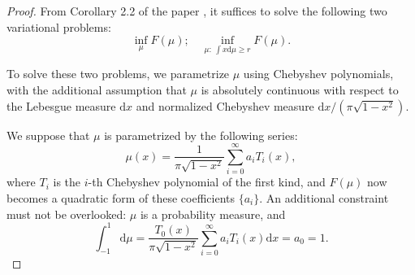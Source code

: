 \documentclass{article} %
\begin{document}
\begin{proof}
    From Corollary 2.2 of the paper \citep{Eichelsbacher_2011}, it suffices to solve the following two variational problems:
    \[ \inf_\mu F(\mu); \quad \inf_{\mu:\  \int x\mathrm{d} \mu \ge r} F(\mu). \]

    To solve these two problems, we parametrize $\mu$ using Chebyshev polynomials, with the additional assumption that 
    $\mu$ is absolutely continuous with respect to the Lebesgue measure $\mathrm{d}x$ 
    and normalized Chebyshev measure $\mathrm{d}x/(\pi \sqrt{1-x^2})$. 

    We suppose that $\mu$ is parametrized by the following series:
    \[ \mu(x) = \frac{1}{\pi \sqrt{1-x^2}} \sum_{i=0}^{\infty} a_i T_i(x),\]
    where $T_i$ is the $i$-th Chebyshev polynomial of the first kind, and $F(\mu)$ now becomes a quadratic form of these coefficients $\{a_i\}$.
    An additional constraint must not be overlooked: $\mu$ is a probability measure, and
    \[ \int_{-1}^{1} \mathrm{d} \mu = \frac{T_0(x)}{\pi \sqrt{1-x^2}} \sum_{i=0}^{\infty} a_i T_i(x) \mathrm{d} x = a_0 = 1.\] 


\end{proof}
\end{document}
